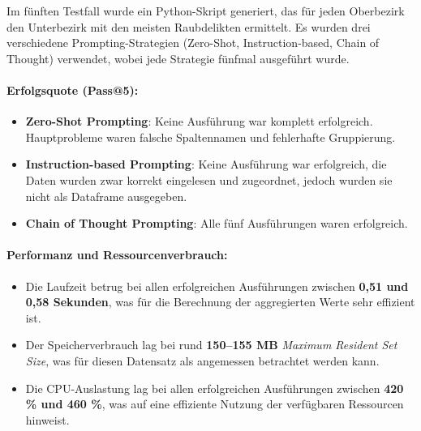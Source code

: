 \documentclass[11pt,a4paper]{article}
\begin{document}
Im fünften Testfall wurde ein Python-Skript generiert, das für jeden Oberbezirk den Unterbezirk mit den meisten Raubdelikten ermittelt. Es wurden drei verschiedene Prompting-Strategien (Zero-Shot, Instruction-based, Chain of Thought) verwendet, wobei jede Strategie fünfmal ausgeführt wurde.

\paragraph{Erfolgsquote (Pass@5):}
\begin{itemize}
    \item \textbf{Zero-Shot Prompting}: Keine Ausführung war komplett erfolgreich. Hauptprobleme waren falsche Spaltennamen und fehlerhafte Gruppierung.
    \item \textbf{Instruction-based Prompting}: Keine Ausführung war erfolgreich, die Daten wurden zwar korrekt eingelesen und zugeordnet, jedoch wurden sie nicht als Dataframe ausgegeben.
    \item \textbf{Chain of Thought Prompting}: Alle fünf Ausführungen waren erfolgreich.
\end{itemize}

\begin{table}[h]
    \centering
    \caption{Ergebnisse von Testfall 5}
    \label{tab:testcase5_ergebnisse}
\end{table}

\paragraph{Performanz und Ressourcenverbrauch:}
\begin{itemize}
    \item Die Laufzeit betrug bei allen erfolgreichen Ausführungen zwischen \textbf{0,51 und 0,58 Sekunden}, was für die Berechnung der aggregierten Werte sehr effizient ist.
    \item Der Speicherverbrauch lag bei rund \textbf{150--155 MB} \emph{Maximum Resident Set Size}, was für diesen Datensatz als angemessen betrachtet werden kann.
    \item Die CPU-Auslastung lag bei allen erfolgreichen Ausführungen zwischen \textbf{420 \% und 460 \%}, was auf eine effiziente Nutzung der verfügbaren Ressourcen hinweist.
\end{itemize}
\end{document}
